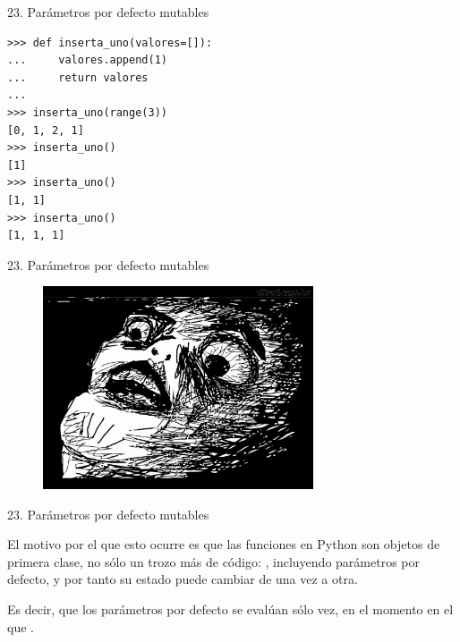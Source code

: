 \documentclass[14pt]{beamer}
\begin{document}
\begin{frame}[fragile]{23. Parámetros por defecto mutables}
  \begin{exampleblock}{}
    \small
    \begin{lstlisting}
>>> def inserta_uno(valores=[]):
...     valores.append(1)
...     return valores
...
>>> inserta_uno(range(3))
[0, 1, 2, 1]
>>> inserta_uno()
[1]
>>> inserta_uno()
[1, 1]
>>> inserta_uno()
[1, 1, 1]
    \end{lstlisting}
  \end{exampleblock}
\end{frame}

\begin{frame}[fragile]{23. Parámetros por defecto mutables}
  \begin{figure}
    \centering
    \includegraphics[height=6cm]{pics/omg-face.jpg}
  \end{figure}
\end{frame}

\begin{frame}[fragile]{23. Parámetros por defecto mutables}
  \begin{block}{}
    \centering
    \small
    El motivo por el que esto ocurre es que las funciones en Python
    son objetos de primera clase, no sólo un trozo más de código:
    , incluyendo parámetros
    por defecto, y por tanto su estado puede cambiar de una vez a
    otra.
  \end{block}

  \begin{alertblock}{}
    \centering
    Es decir, que los parámetros por defecto se evalúan sólo
     vez, en el momento en el que .
  \end{alertblock}
\end{frame}
\end{document}
